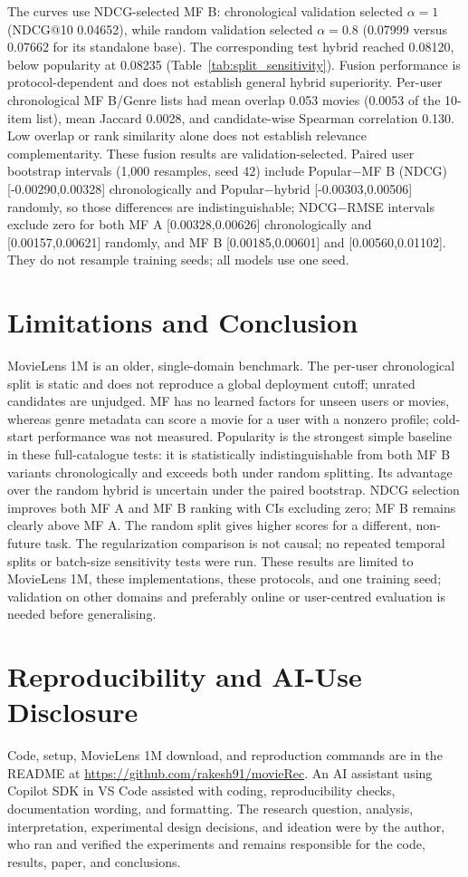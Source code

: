 \documentclass{article}
\begin{document}
The curves use NDCG-selected MF B: chronological validation selected
$\alpha=1$ (NDCG@10 0.04652), while random validation selected $\alpha=0.8$
(0.07999 versus 0.07662 for its standalone base). The corresponding test
hybrid reached 0.08120, below popularity at 0.08235 (Table~\ref{tab:split_sensitivity}).
Fusion performance is protocol-dependent and
does not establish general hybrid superiority. Per-user chronological MF B/Genre lists had mean overlap
0.053 movies (0.0053 of the 10-item list), mean Jaccard 0.0028, and
candidate-wise Spearman correlation 0.130. Low overlap or rank similarity
alone does not establish relevance complementarity. These fusion results are
validation-selected. Paired user bootstrap intervals (1,000 resamples, seed
42) include Popular$-$MF B (NDCG) [-0.00290,0.00328] chronologically and
Popular$-$hybrid [-0.00303,0.00506] randomly, so those differences are
indistinguishable; NDCG$-$RMSE intervals exclude zero for both MF A
[0.00328,0.00626] chronologically and [0.00157,0.00621] randomly, and MF B
[0.00185,0.00601] and [0.00560,0.01102]. They do not resample training
seeds; all models use one seed.

\section{Limitations and Conclusion}
MovieLens 1M is an older, single-domain benchmark. The per-user chronological
split is static and does not reproduce a global deployment cutoff; unrated
candidates are unjudged.
MF has no learned factors for unseen users or movies, whereas genre metadata
can score a movie for a user with a nonzero profile; cold-start performance
was not measured. Popularity is the strongest simple baseline in these full-catalogue tests:
it is statistically indistinguishable from both MF B variants chronologically
and exceeds both under random splitting. Its advantage over the random hybrid
is uncertain under the paired bootstrap. NDCG selection improves both MF A and
MF B ranking with CIs excluding zero; MF B remains clearly above MF A. The
random split gives higher scores for a
different, non-future task. The regularization comparison is not causal; no
repeated temporal splits or batch-size sensitivity tests were run. These
results are limited to MovieLens 1M, these implementations, these protocols,
and one training seed; validation on other domains and preferably online or
user-centred evaluation is needed before generalising.

\section{Reproducibility and AI-Use Disclosure}
Code, setup, MovieLens 1M download, and reproduction commands are in the
README at \url{https://github.com/rakesh91/movieRec}. An AI assistant using
Copilot SDK in VS Code assisted with coding, reproducibility checks,
documentation wording, and formatting. The research question, analysis,
interpretation, experimental design decisions, and ideation were by the
author, who ran and verified the experiments and remains responsible for the
code, results, paper, and conclusions.
\end{document}
